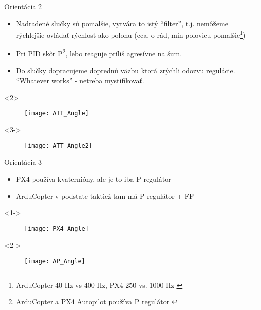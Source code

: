 \begin{frame}[t]{Orientácia 2}
\begin{itemize}
  \item<1-> Nadradené slučky sú pomalšie, vytvára to istý ``filter'', t.j. nemôžeme rýchlejšie ovládať rýchlosť ako polohu (cca. o rád, min polovicu pomalšie\footnote{ArduCopter 40 Hz vs 400 Hz, PX4 250 vs. 1000 Hz \citep{AP:PID,PX4:PID}}) \citep{AP:PID,PX4:PID}
  \item<2-> Pri PID skôr P\footnote{ArduCopter a PX4 Autopilot používa P regulátor \citep{PX4:PID,AP:PIDDOC}}, lebo reaguje príliš agresívne na šum.
  \item<3-> Do slučky dopracujeme doprednú väzbu  ktorá zrýchli odozvu regulácie. ``Whatever works'' - netreba mystifikovať.
  \end{itemize}



  \begin{onlyenv}<2>
  \begin{figure}
\centering
  \texttt{[image: ATT\_Angle]}\\
\end{figure}
\end{onlyenv}

  \begin{onlyenv}<3->
\begin{figure}
\centering
  \texttt{[image: ATT\_Angle2]}\\
 \end{figure}
\end{onlyenv}

  \end{frame}



  \begin{frame}[t]{Orientácia 3}
\begin{itemize}
  \item<1-> PX4 používa kvaternióny, ale je to iba P regulátor
  \item<2-> ArduCopter v podstate taktiež tam má P regulátor + FF
\end{itemize}

  \begin{onlyenv}<1->
  \begin{figure}
\centering
  \texttt{[image: PX4\_Angle]}\\
\end{figure}
\end{onlyenv}


  \begin{onlyenv}<2->
  \begin{figure}
\centering
  \texttt{[image: AP\_Angle]}\\
\end{figure}
\end{onlyenv}

  \end{frame}
